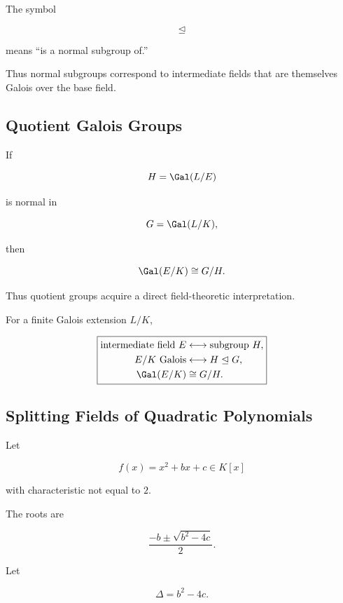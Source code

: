 The symbol

\[ \trianglelefteq \]

means ``is a normal subgroup of.''

Thus normal subgroups correspond to intermediate fields that are themselves
Galois over the base field.

\subsection{Quotient Galois Groups}
\label{subsec:quotient-galois-groups}

If

\[ H=\Gal(L/E) \]

is normal in

\[ G=\Gal(L/K), \]

then

\[ \Gal(E/K)\cong G/H. \]

Thus quotient groups acquire a direct field-theoretic interpretation.

\begin{conceptbox}
For a finite Galois extension \(L/K\),

\[
\boxed{
\begin{aligned}
\text{intermediate field }E
&\longleftrightarrow
\text{subgroup }H,\\
E/K\text{ Galois}
&\longleftrightarrow
H\trianglelefteq G,\\
\Gal(E/K)
&\cong G/H.
\end{aligned}}
\]
\end{conceptbox}

\subsection{Splitting Fields of Quadratic Polynomials}
\label{subsec:galois-quadratic-polynomials}

Let

\[ f(x)=x^2+bx+c\in K[x] \]

with characteristic not equal to \(2\).

The roots are

\[ \frac{-b\pm\sqrt{b^2-4c}}{2}. \]

Let

\[ \Delta=b^2-4c. \]

